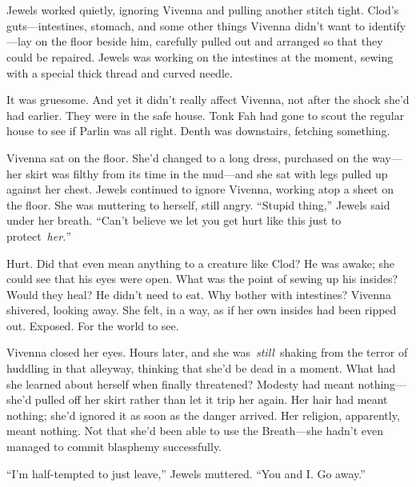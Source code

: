 \chapter{}

Jewels worked quietly, ignoring Vivenna and pulling another stitch tight. Clod’s guts—intestines, stomach, and some other things Vivenna didn’t want to identify—lay on the floor beside him, carefully pulled out and arranged so that they could be repaired. Jewels was working on the intestines at the moment, sewing with a special thick thread and curved needle.

It was gruesome. And yet it didn’t really affect Vivenna, not after the shock she’d had earlier. They were in the safe house. Tonk Fah had gone to scout the regular house to see if Parlin was all right. Denth was downstairs, fetching something.

Vivenna sat on the floor. She’d changed to a long dress, purchased on the way—her skirt was filthy from its time in the mud—and she sat with legs pulled up against her chest. Jewels continued to ignore Vivenna, working atop a sheet on the floor. She was muttering to herself, still angry. “Stupid thing,” Jewels said under her breath. “Can’t believe we let you get hurt like this just to protect~\textit{her.}”

Hurt. Did that even mean anything to a creature like Clod? He was awake; she could see that his eyes were open. What was the point of sewing up his insides? Would they heal? He didn’t need to eat. Why bother with intestines? Vivenna shivered, looking away. She felt, in a way, as if her own insides had been ripped out. Exposed. For the world to see.

Vivenna closed her eyes. Hours later, and she was~\textit{still}~shaking from the terror of huddling in that alleyway, thinking that she’d be dead in a moment. What had she learned about herself when finally threatened? Modesty had meant nothing—she’d pulled off her skirt rather than let it trip her again. Her hair had meant nothing; she’d ignored it as soon as the danger arrived. Her religion, apparently, meant nothing. Not that she’d been able to use the Breath—she hadn’t even managed to commit blasphemy successfully.

“I’m half-tempted to just leave,” Jewels muttered. “You and I. Go away.”

